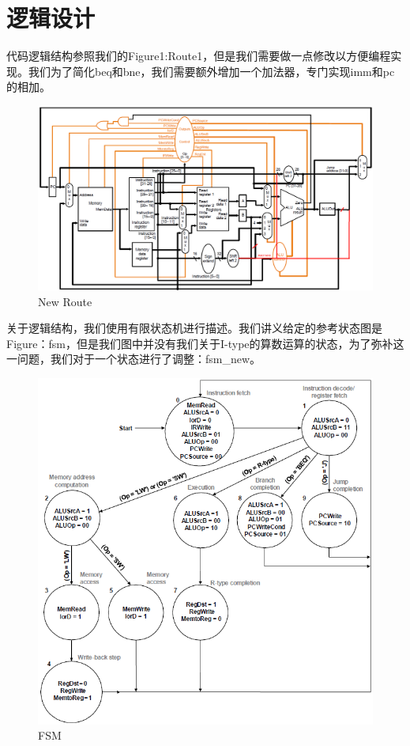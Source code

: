 \documentclass[12pt, a4paper]{article}
\begin{document}
\section{逻辑设计}
代码逻辑结构参照我们的Figure1:Route1，但是我们需要做一点修改以方便编程实现。我们为了简化beq和bne，我们需要额外增加一个加法器，专门实现imm和pc的相加。
\begin{figure}[H]
	\centering
	\includegraphics[width=1.0\linewidth]{pics/route}
	\caption{New Route}
	\label{fig:pic}
\end{figure}
关于逻辑结构，我们使用有限状态机进行描述。我们讲义给定的参考状态图是Figure：fsm，但是我们图中并没有我们关于I-type的算数运算的状态，为了弥补这一问题，我们对于一个状态进行了调整：fsm\_new。
\begin{figure}[H]
	\centering
	\includegraphics[width=1.0\linewidth]{pics/Picture2}
	\caption{FSM}
	\label{fig:fsm}
\end{figure}
\end{document}
